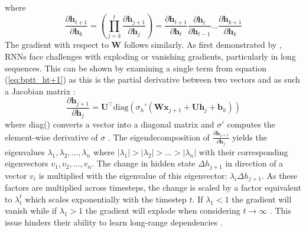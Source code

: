 \documentclass[12pt, a4paper, headinclude, twoside, plainheadsepline, open=right, numbers=noenddot, hidelinks, toc=listof, toc=bibliography]{scrreprt}
\begin{document}
where
\begin{equation}
\label{eq:bptt_ht+1}
\frac{\partial \mathbf{h}_{t+1}}{\partial \mathbf{h}_k} 
= 
\left(\prod_{j=k}^{t}\frac{\partial \mathbf{h}_{j+1}}{\partial \mathbf{h}_j}\right)
=
\frac{\partial \mathbf{h}_{t+1}}{\partial \mathbf{h}_t}
\frac{\partial \mathbf{h}_{t}}{\partial \mathbf{h}_{t-1}}
 . . . 
\frac{\partial \mathbf{h}_{k+1}}{\partial \mathbf{h}_k}   
\end{equation}
The gradient with respect to $\mathbf{W}$ follows similarly.
As first demonstrated by \citeauthor{bengioLearningLongtermDependencies1994} \cite{bengioLearningLongtermDependencies1994}, RNNs face challenges with exploding or vanishing gradients, particularly in long sequences.
This can be shown by examining a single term from equation (\ref{eq:bptt_ht+1}) as this is the partial derivative between two vectors and as such a Jacobian matrix :
\begin{equation}
\label{eq:bptt_jacobian}
\frac{\partial \mathbf{h}_{j+1}}{\partial \mathbf{h}_j}
= 
\mathbf{U}^{\top} \text{diag}(\sigma_{h}' (\mathbf{W} \mathbf{x}_{j+1} + \mathbf{U} \mathbf{h}_j + \mathbf{b}_h))
\end{equation}
where diag() converts a vector into a diagonal matrix and $\sigma '$ computes the element-wise derivative of $\sigma$
\cite{pascanuDifficultyTrainingRecurrent2013a}.
The eigendecomposition of $\frac{\partial \mathbf{h}_{j+1}}{\partial \mathbf{h}_j}$ yields the eigenvalues $ \lambda_1, \lambda_2, ..., \lambda_n$ where $|\lambda_1| > |\lambda_2| > ... > |\lambda_n|$ with their corresponding eigenvectors $v_1, v_2, ..., v_n$.
The change in hidden state $\Delta h_{j+1}$ in direction of a vector $v_i$ is multiplied with the eigenvalue of this eigenvector: $\lambda_i \Delta h_{j+1}$.
As these factors are multiplied across timesteps, the change is scaled by a factor equivalent to $\lambda_i^t$ which scales exponentially with the timestep $t$.
If $\lambda_1 < 1$ the gradient will vanish while if $\lambda_1 > 1$ the gradient will explode when considering $t \to \infty$ \cite{pascanuDifficultyTrainingRecurrent2013a}.
This issue hinders their ability to learn long-range dependencies \cite{sutskeverTrainingRecurrentNeural2013}. 
\end{document}
